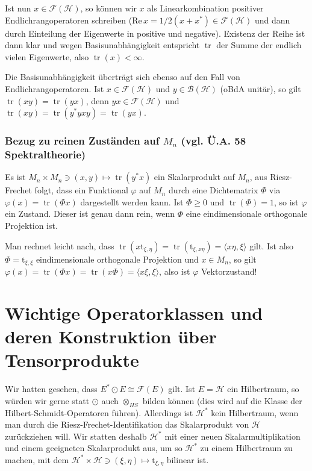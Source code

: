 \documentclass[11pt,a4paper]{scrartcl}
\newcommand{\Hc}{\mathcal{H}}
\newcommand{\B}{\mathcal{B}}
\newcommand{\F}{\mathcal{F}}
\renewcommand{\Re}{\mathrm{Re}\,}
\theoremstyle{plain}
\theoremstyle{definition}
\theoremstyle{remark}
\DeclareMathOperator{\tr}{tr}
\begin{document}
Ist nun $x\in \F(\Hc)$, so können wir $x$ als Linearkombination positiver Endlichrangoperatoren schreiben ($\Re x = 1/2(x+x^*) \in \F(\Hc)$ und dann durch Einteilung der Eigenwerte in positive und negative). Existenz der Reihe ist dann klar und wegen Basisunabhängigkeit entspricht $\tr$ der Summe der endlich vielen Eigenwerte, also $\tr(x) < \infty$.

Die Basisunabhängigkeit überträgt sich ebenso auf den Fall von Endlichrangoperatoren. Ist $x\in \F(\Hc)$ und $y\in \B(\Hc)$ (oBdA unitär), so gilt $\tr(xy)=\tr(yx)$, denn $yx\in \F(\Hc)$ und $\tr(xy)=\tr(y^*yxy)=\tr(yx)$.

\subsubsection{Bezug zu reinen Zuständen auf $M_n$ (vgl. Ü.A. 58 Spektraltheorie)}

Es ist $M_n\times M_n \ni (x,y) \mapsto \tr(y^*x)$ ein Skalarprodukt auf $M_n$, aus Riesz-Frechet folgt, dass ein Funktional $\varphi$ auf $M_n$ durch eine Dichtematrix $\Phi$ via $\varphi(x)=\tr(\Phi x)$ dargestellt werden kann. Ist $\Phi \geq 0$ und $\tr(\Phi)=1$, so ist $\varphi$ ein Zustand. Dieser ist genau dann rein, wenn $\Phi$ eine eindimensionale orthogonale Projektion ist.

Man rechnet leicht nach, dass $\tr(x \mathrm{t}_{\xi,\eta})=\tr(\mathrm{t}_{\xi,x\eta})=\langle x\eta, \xi \rangle$ gilt. Ist also $\Phi=\mathrm{t}_{\xi,\xi}$ eindimensionale orthogonale Projektion und $x\in M_n$, so gilt $\varphi(x)=\tr(\Phi x)=\tr(x \Phi)=\langle x\xi, \xi \rangle$, also ist $\varphi$ Vektorzustand!

\section{Wichtige Operatorklassen und deren Konstruktion über Tensorprodukte}

Wir hatten gesehen, dass $E^*\odot E \cong \F(E)$ gilt. Ist $E=\Hc$ ein Hilbertraum, so würden wir gerne statt $\odot$ auch $\otimes_{HS}$ bilden können (dies wird auf die Klasse der Hilbert-Schmidt-Operatoren führen). Allerdings ist $\Hc^*$ kein Hilbertraum, wenn man durch die Riesz-Frechet-Identifikation das Skalarprodukt von $\Hc$ zurückziehen will. Wir statten deshalb $\Hc^*$ mit einer neuen Skalarmultiplikation und einem geeigneten Skalarprodukt aus, um so $\Hc^*$ zu einem Hilbertraum zu machen, mit dem $\Hc^*\times \Hc \ni (\xi,\eta) \mapsto \mathrm{t}_{\xi,\eta}$ bilinear ist.
\end{document}

